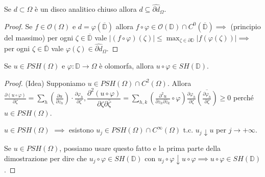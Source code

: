 \begin{lm}
  Se $d \subset \Omega$ è un disco analitico chiuso allora $d \subseteq \widehat{\partial d}_{\Omega}$.
\end{lm}

\begin{proof}
  Se $f \in \mathcal{O}(\Omega)$ e $d=\varphi(\overline{\mathbb{D}})$ allora $f \circ \varphi \in \mathcal{O}(\mathbb{D}) \cap C^0(\overline{\mathbb{D}}) \implies$ (principio del massimo) per ogni $\zeta \in \overline{\mathbb{D}}$ vale $\displaystyle |(f\circ \varphi)(\zeta)| \le \max_{\zeta \in \partial\mathbb{D}} |f(\varphi(\zeta))| \implies$
  per ogni $\zeta \in \overline{\mathbb{D}}$ vale $\varphi(\zeta) \in \widehat{\partial d}_{\Omega}$.
\end{proof}

\begin{lm}
  Se $u \in PSH(\Omega)$ e $\varphi:\mathbb{D} \longrightarrow \Omega$ è olomorfa, allora $u \circ \varphi \in SH(\mathbb{D})$.
\end{lm}

\begin{proof}
  (Idea) Supponiamo $u \in PSH(\Omega)\cap C^2(\Omega)$.
  Allora $\displaystyle \frac{\partial(u\circ\varphi)}{\partial\zeta}=\sum_h \left(\frac{\partial u}{\partial z_h}\right)\cdot\frac{\partial\varphi_h}{\partial\zeta}, \dfrac{\partial^2(u\circ\varphi)}{\partial\zeta\partial\bar{\zeta}}=\sum_{h,k} \left(\frac{\partial^2 u}{\partial z_h\partial\bar{z}_k}\circ\varphi\right)\frac{\partial\varphi_h}{\partial\zeta}\overline{\left(\frac{\partial\varphi_h}{\partial\zeta}\right)} \ge 0$ perché $u \in PSH(\Omega)$.
  \begin{ftt}
    $u \in PSH(\Omega)$ $\implies$ esistono $u_j \in PSH(\Omega) \cap C^{\infty}(\Omega)$ t.c. $u_j \downarrow u$ per $j \longrightarrow+\infty$.
  \end{ftt}

  Se $u \in PSH(\Omega)$, possiamo usare questo fatto e la prima parte della dimostrazione per dire che $u_j \circ \varphi \in SH(\mathbb{D})$ con $u_j \circ \varphi \downarrow u \circ \varphi \implies u \circ \varphi \in SH(\mathbb{D})$.
\end{proof}

